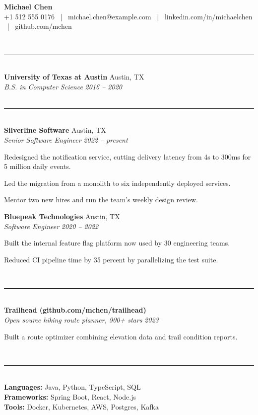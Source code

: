 \documentclass[10pt,a4paper]{article}
\newcommand{\sectionrule}[1]{\vspace{6pt}{\large\bfseries #1}\\[-7pt]\rule{\linewidth}{0.8pt}\\[1pt]}
\newcommand{\resumeItem}[1]{\item #1}
\newcommand{\resumeSubheading}[4]{%
  \textbf{#1} \hfill #2\\
  {\itshape #3} \hfill {\itshape #4}\\[2pt]
}
\begin{document}
\begin{center}
{\LARGE\bfseries Michael Chen}\\[3pt]
{\small +1 512 555 0176 \, | \, michael.chen@example.com \, | \, linkedin.com/in/michaelchen \, | \, github.com/mchen}
\end{center}

\sectionrule{Education}
\resumeSubheading{University of Texas at Austin}{Austin, TX}{B.S. in Computer Science}{2016 -- 2020}

\sectionrule{Experience}
\resumeSubheading{Silverline Software}{Austin, TX}{Senior Software Engineer}{2022 -- present}
\begin{resumeItemList}
  \resumeItem{Redesigned the notification service, cutting delivery latency from 4s to 300ms for 5 million daily events.}
  \resumeItem{Led the migration from a monolith to six independently deployed services.}
  \resumeItem{Mentor two new hires and run the team's weekly design review.}
\end{resumeItemList}

\resumeSubheading{Bluepeak Technologies}{Austin, TX}{Software Engineer}{2020 -- 2022}
\begin{resumeItemList}
  \resumeItem{Built the internal feature flag platform now used by 30 engineering teams.}
  \resumeItem{Reduced CI pipeline time by 35 percent by parallelizing the test suite.}
\end{resumeItemList}

\sectionrule{Projects}
\resumeSubheading{Trailhead (github.com/mchen/trailhead)}{}{Open source hiking route planner, 900+ stars}{2023}
\begin{resumeItemList}
  \resumeItem{Built a route optimizer combining elevation data and trail condition reports.}
\end{resumeItemList}

\sectionrule{Technical Skills}
\textbf{Languages:} Java, Python, TypeScript, SQL\\
\textbf{Frameworks:} Spring Boot, React, Node.js\\
\textbf{Tools:} Docker, Kubernetes, AWS, Postgres, Kafka
\end{document}
